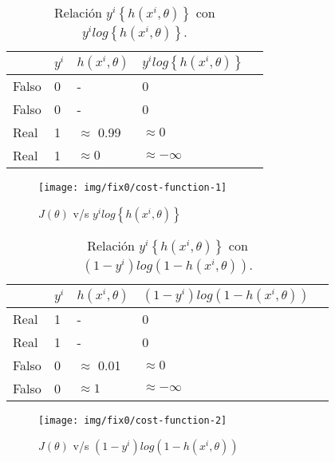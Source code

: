 \begin{table}[H]
        \centering
        \caption{Relación $ y^{i} \left\{ h(x^{i}, \theta)  \right\}$ con $ y^{i} log \left\{ h(x^{i}, \theta)  \right\}$.}
        \label{table:mejorFormato}
        \begin{tabular}{lllll}
        \hline
        &$y^{i}$ &  $h(x^{i}, \theta)$         & $y^{i} log \left\{ h(x^{i}, \theta)  \right\}$            &     \\ \hline
        Falso  & 0           & -          & 0      \\
        Falso  & 0           & -          & 0      \\
        Real   & 1           & $\approx$ 0.99       & $\approx 0$      \\
        Real   & 1           & $\approx 0$       & $\approx - \infty$       \\ \hline
        \end{tabular}
        \label{table:y_log}
\end{table}

\begin{figure}[H]
    \texttt{[image: img/fix0/cost-function-1]}
    \centering
    \caption{$ J(\theta)$ v/s  $ y^{i} log \left\{ h(x^{i}, \theta)  \right\}$}
    \label{fig:y_log}
\end{figure}


\begin{table}[H]
    \centering
    \caption{Relación $ y^{i} \left\{ h(x^{i}, \theta)  \right\}$ con $ \left( 1-y^{i} \right) log \left( 1 - h(x^{i}, \theta) \right)$.}
    \label{table:mejorFormato}
    \begin{tabular}{lllll}
    \hline
    &$y^{i}$ &  $h(x^{i}, \theta)$         & $\left( 1-y^{i} \right) log \left( 1 - h(x^{i}, \theta) \right)$            &     \\ \hline
    Real    & 1           & -          & 0      \\
    Real    & 1           & -          & 0      \\
    Falso   & 0           & $\approx$ 0.01       & $\approx 0$      \\
    Falso   & 0           & $\approx 1$       & $\approx - \infty$       \\ \hline
    \end{tabular}
    \label{table:1-y_log}
\end{table}

\begin{figure}[H]
    \texttt{[image: img/fix0/cost-function-2]}
    \centering
    \caption{$J(\theta)$ v/s $\left( 1-y^{i} \right) log \left(  1 -   h(x^{i}, \theta) \right)$}
    \label{fig:1-y_log}
\end{figure}


